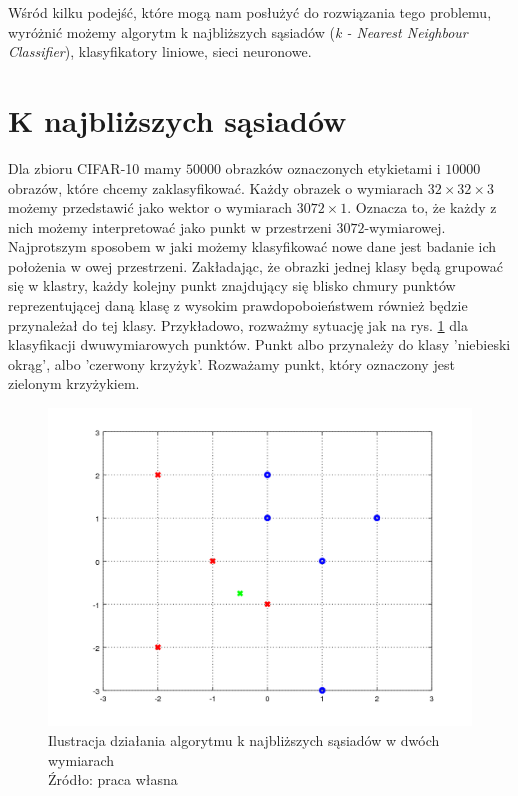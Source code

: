 Wśród kilku podejść, które mogą nam posłużyć do rozwiązania tego problemu, wyróżnić możemy algorytm k najbliższych sąsiadów (\textit{k - Nearest Neighbour Classifier}), klasyfikatory liniowe, sieci neuronowe.

\section{K najbliższych sąsiadów}\label{sec:knear}

Dla zbioru CIFAR-10 mamy $50000$ obrazków oznaczonych etykietami i $10000$ obrazów, które chcemy zaklasyfikować.
Każdy obrazek o wymiarach $32 \times 32 \times 3$ możemy przedstawić jako wektor o wymiarach $3072 \times 1$.
Oznacza to, że każdy z nich możemy interpretować jako punkt w przestrzeni $3072$-wymiarowej.
Najprotszym sposobem w jaki możemy klasyfikować nowe dane jest badanie ich położenia w owej przestrzeni.
Zakładając, że obrazki jednej klasy będą grupować się w klastry, każdy kolejny punkt znajdujący się blisko chmury punktów reprezentującej daną klasę z wysokim prawdopoboieństwem również będzie przynależał do tej klasy.
Przykładowo, rozważmy sytuację jak na rys. \ref{fig:knearest} dla klasyfikacji dwuwymiarowych punktów. Punkt albo przynależy do klasy 'niebieski okrąg', albo 'czerwony krzyżyk'. Rozważamy punkt, który oznaczony jest zielonym krzyżykiem.

\begin{figure}[h!tb]
	 \centering
	 \includegraphics[width = 1.0\linewidth]{img/knear}
	 \caption{Ilustracja działania algorytmu k najbliższych sąsiadów w dwóch wymiarach \\
              Źródło: praca własna}
	 \label{fig:knearest}
\end{figure}

